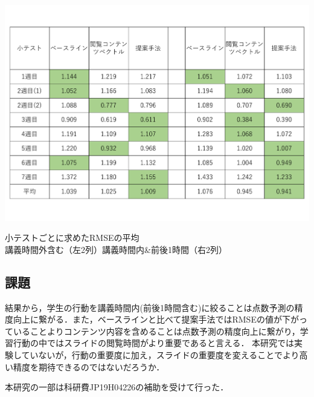 \documentclass[platex,dvipdfmx,a4paper,twocolumn,base=10pt,jbase=10pt,ja=standard]{bxjsarticle}
\begin{document}
\begin{table}[h]
  \centering
  \includegraphics[scale = 0.25]{RMSEhyov3_.pdf}
  \caption{小テストごとに求めたRMSEの平均\\講義時間外含む（左2列）講義時間内\&前後1時間（右2列）}
  \label{tb:小テストごとのRMSE（表）}
\end{table}


\subsection{課題}
結果から，学生の行動を講義時間内(前後1時間含む)に絞ることは点数予測の精度向上に繋がる．また，ベースラインと比べて提案手法ではRMSEの値が下がっていることよりコンテンツ内容を含めることは点数予測の精度向上に繋がり，学習行動の中ではスライドの閲覧時間がより重要であると言える．
本研究では実験していないが，行動の重要度に加え，スライドの重要度を変えることでより高い精度を期待できるのではないだろうか．



\vspace{2mm}
 \quad
本研究の一部は科研費JP19H04226の補助を受けて行った．



{
\footnotesize



}
\end{document}
